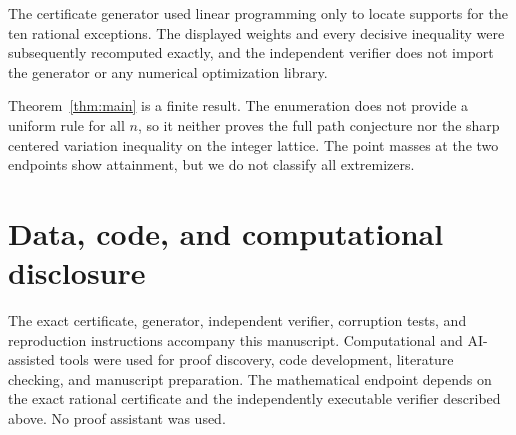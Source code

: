 \documentclass[11pt]{amsart}
\theoremstyle{definition}
\begin{document}
The certificate generator used linear programming only to locate supports
for the ten rational exceptions.  The displayed weights and every decisive
inequality were subsequently recomputed exactly, and the independent
verifier does not import the generator or any numerical optimization
library.

Theorem~\ref{thm:main} is a finite result.  The enumeration does not provide a
uniform rule for all $n$, so it neither proves the full path conjecture nor
the sharp centered variation inequality on the integer lattice.  The point
masses at the two endpoints show attainment, but we do not classify all
extremizers.

\section*{Data, code, and computational disclosure}

The exact certificate, generator, independent verifier, corruption tests,
and reproduction instructions accompany this manuscript.  Computational
and AI-assisted tools were used for proof discovery, code development,
literature checking, and manuscript preparation.  The mathematical endpoint
depends on the exact rational certificate and the independently executable
verifier described above.  No proof assistant was used.



\end{document}
